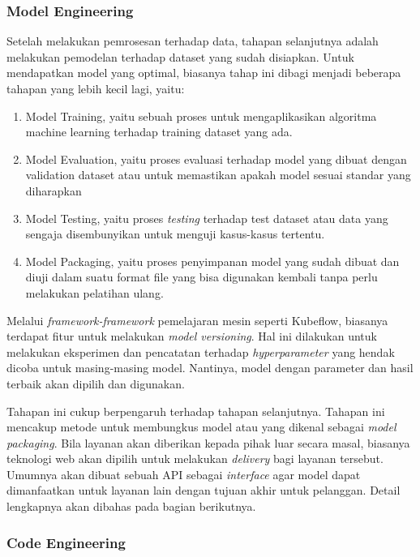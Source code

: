 \subsubsection{Model Engineering}

Setelah melakukan pemrosesan terhadap data, tahapan selanjutnya adalah melakukan pemodelan terhadap dataset yang sudah disiapkan.
Untuk mendapatkan model yang optimal, biasanya tahap ini dibagi menjadi beberapa tahapan yang lebih kecil lagi, yaitu:
\begin{enumerate}
  \item Model Training, yaitu sebuah proses untuk mengaplikasikan algoritma machine learning terhadap training dataset yang ada.
  \item Model Evaluation, yaitu proses evaluasi terhadap model yang dibuat dengan validation dataset atau untuk memastikan apakah model sesuai standar yang diharapkan
  \item Model Testing, yaitu proses \textit{testing} terhadap test dataset atau data yang sengaja disembunyikan untuk menguji kasus-kasus tertentu.
  \item Model Packaging, yaitu proses penyimpanan model yang sudah dibuat dan diuji dalam suatu format file yang bisa digunakan kembali tanpa perlu melakukan pelatihan ulang.
\end{enumerate}

Melalui \textit{framework-framework} pemelajaran mesin seperti Kubeflow, biasanya terdapat fitur untuk melakukan \textit{model versioning}.
Hal ini dilakukan untuk melakukan eksperimen dan pencatatan terhadap \textit{hyperparameter} yang hendak dicoba untuk masing-masing model.
Nantinya, model dengan parameter dan hasil terbaik akan dipilih dan digunakan.

Tahapan ini cukup berpengaruh terhadap tahapan selanjutnya.
Tahapan ini mencakup metode untuk membungkus model atau yang dikenal sebagai \textit{model packaging}.
Bila layanan akan diberikan kepada pihak luar secara masal, biasanya teknologi web akan dipilih untuk melakukan \textit{delivery} bagi layanan tersebut.
Umumnya akan dibuat sebuah API sebagai \textit{interface} agar model dapat dimanfaatkan untuk layanan lain dengan tujuan akhir untuk pelanggan. Detail lengkapnya akan dibahas pada bagian berikutnya. 

\subsubsection{Code Engineering}

